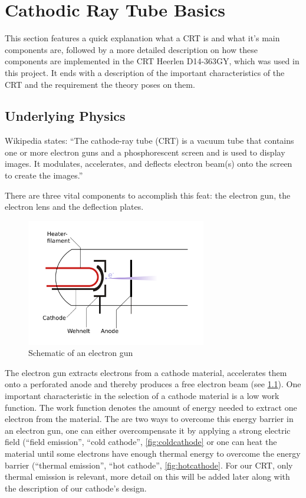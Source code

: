 
\chapter{Cathodic Ray Tube Basics}

This section features a quick explanation what a CRT is and what it's main components are, followed by a more detailed description on how these components are implemented in the CRT Heerlen D14-363GY, which was used in this project. It ends with a description of the important characteristics of the CRT and the requirement the theory poses on them.

\section{Underlying Physics}

Wikipedia states: ``The cathode-ray tube (CRT) is a vacuum tube that contains one or more electron guns and a phosphorescent screen and is used to display images. It modulates, accelerates, and deflects electron beam(s) onto the screen to create the images.''

There are three vital components to accomplish this feat: the electron gun, the electron lens and the deflection plates.

\begin{figure}
	\centering
	\includegraphics[width=0.7\textwidth]{Chapters/CRT-Basics/electron_gun}
	\caption{Schematic of an electron gun}
	\label{fig:electrongun}
\end{figure}


The electron gun extracts electrons from a cathode material, accelerates them onto a perforated anode and thereby produces a free electron beam (see \cref{fig:electrongun}). One important characteristic in the selection of a cathode material is a low work function. The work function denotes the amount of energy needed to extract one electron from the material. The are two ways to overcome this energy barrier in an electron gun, one can either overcompensate it by applying a strong electric field (``field emission'', ``cold cathode'', \cref{fig:coldcathode} or one can heat the material until some electrons have enough thermal energy to overcome the energy barrier (``thermal emission'', ``hot cathode'', \cref{fig:hotcathode}. For our CRT, only thermal emission is relevant, more detail on this will be added later along with the description of our cathode's design. 

